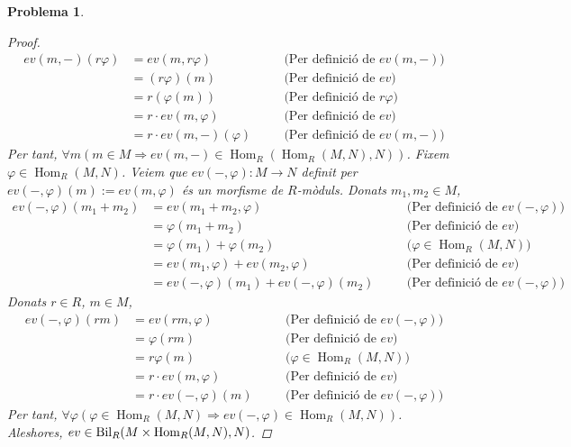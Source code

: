 \documentclass[compress]{article}
\newtheorem{problema}{Problema}
\theoremstyle{definition}
\DeclareMathOperator{\Hom}{Hom}
\DeclareMathOperator{\Bil}{Bil}
\begin{document}
\begin{problema}
\begin{enumerate}
\begin{proof}
\begin{align*}
                 ev(m,-)(r\varphi)
                 &=ev(m,r\varphi)
                 &\quad&\textrm{(Per definició de $ev(m,-)$)}\\
                 &=(r\varphi)(m)
                 &\quad&\textrm{(Per definició de $ev$)}\\
                 &=r(\varphi(m))
                 &\quad&\textrm{(Per definició de $r\varphi$)}\\
                 &=r\cdot ev(m,\varphi)
                 &\quad&\textrm{(Per definició de $ev$)}\\
                 &=r\cdot ev(m,-)(\varphi)
                 &\quad&\textrm{(Per definició de $ev(m,-)$)}
             \end{align*}
             Per tant, $\forall m(m\in M\Rightarrow ev(m,-)\in\Hom_{R}(\Hom_{R}(M,N),N))$. Fixem $\varphi\in\Hom_{R}(M,N)$. Veiem que $ev(-,\varphi):M\rightarrow N$ definit per $ev(-,\varphi)(m):=ev(m,\varphi)$ és un morfisme de $R$-mòduls. Donats $m_{1},m_{2}\in M$,
             \begin{align*}
                 ev(-,\varphi)(m_{1}+m_{2})
                 &=ev(m_{1}+m_{2},\varphi)
                 &\quad&\textrm{(Per definició de $ev(-,\varphi)$)}\\
                 &=\varphi(m_{1}+m_{2})
                 &\quad&\textrm{(Per definició de $ev$)}\\
                 &=\varphi(m_{1})+\varphi(m_{2})
                 &\quad&\textrm{($\varphi\in\Hom_{R}(M,N)$)}\\
                 &=ev(m_{1},\varphi)+ev(m_{2},\varphi)
                 &\quad&\textrm{(Per definició de $ev$)}\\
                 &=ev(-,\varphi)(m_{1})+ev(-,\varphi)(m_{2})
                 &\quad&\textrm{(Per definició de $ev(-,\varphi)$)}
             \end{align*}
             Donats $r\in R$, $m\in M$,
             \begin{align*}
                 ev(-,\varphi)(rm)
                 &=ev(rm,\varphi)
                 &\quad&\textrm{(Per definició de $ev(-,\varphi)$)}\\
                 &=\varphi(rm)
                 &\quad&\textrm{(Per definició de $ev$)}\\
                 &=r\varphi(m)
                 &\quad&\textrm{($\varphi\in\Hom_{R}(M,N)$)}\\
                 &=r\cdot ev(m,\varphi)
                 &\quad&\textrm{(Per definició de $ev$)}\\
                 &=r\cdot ev(-,\varphi)(m)
                 &\quad&\textrm{(Per definició de $ev(-,\varphi)$)}
             \end{align*}
             Per tant, $\forall\varphi(\varphi\in\Hom_{R}(M,N)\Rightarrow ev(-,\varphi)\in\Hom_{R}(M,N))$. Aleshores, $ev\in\Bil_{R}(M\times\Hom_{R}(M,\newline N),N)$.
         \end{proof}
     \end{enumerate}
\end{problema}
\end{document}
